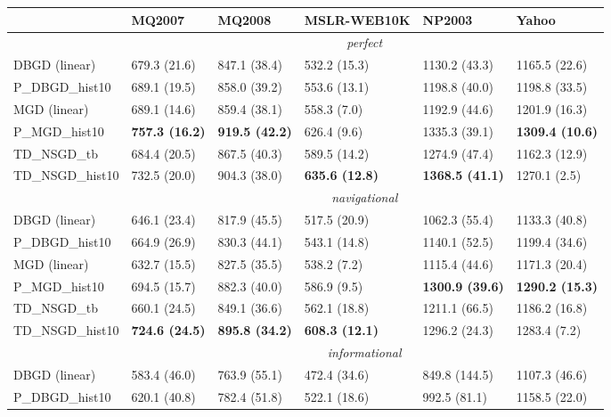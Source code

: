 \begin{tabular*}{\textwidth}{@{\extracolsep{\fill} } l  l l l l l  }
\toprule
 & { \small \textbf{MQ2007}}  & { \small \textbf{MQ2008}}  & { \small \textbf{MSLR-WEB10K}}  & { \small \textbf{NP2003}}  & { \small \textbf{Yahoo}} \\
\midrule
& \multicolumn{5}{|c|}{\textit{perfect}} \\
\midrule
DBGD (linear) & 679.3 {\tiny (21.6)} & 847.1 {\tiny (38.4)} & 532.2 {\tiny (15.3)} & 1130.2 {\tiny (43.3)} & 1165.5 {\tiny (22.6)} \\
P\_DBGD\_hist10 & 689.1 {\tiny (19.5)} & 858.0 {\tiny (39.2)} & 553.6 {\tiny (13.1)} & 1198.8 {\tiny (40.0)} & 1198.8 {\tiny (33.5)} \\
MGD (linear) & 689.1 {\tiny (14.6)} & 859.4 {\tiny (38.1)} & 558.3 {\tiny (7.0)} & 1192.9 {\tiny (44.6)} & 1201.9 {\tiny (16.3)} \\
P\_MGD\_hist10 & \bf 757.3 {\tiny (16.2)} & \bf 919.5 {\tiny (42.2)} & 626.4 {\tiny (9.6)} & 1335.3 {\tiny (39.1)} & \bf 1309.4 {\tiny (10.6)} \\
TD\_NSGD\_tb & 684.4 {\tiny (20.5)} & 867.5 {\tiny (40.3)} & 589.5 {\tiny (14.2)} & 1274.9 {\tiny (47.4)} & 1162.3 {\tiny (12.9)} \\
TD\_NSGD\_hist10 & 732.5 {\tiny (20.0)} & 904.3 {\tiny (38.0)} & \bf 635.6 {\tiny (12.8)} & \bf 1368.5 {\tiny (41.1)} & 1270.1 {\tiny (2.5)} \\
\midrule
& \multicolumn{5}{|c|}{\textit{navigational}} \\
\midrule
DBGD (linear) & 646.1 {\tiny (23.4)} & 817.9 {\tiny (45.5)} & 517.5 {\tiny (20.9)} & 1062.3 {\tiny (55.4)} & 1133.3 {\tiny (40.8)} \\
P\_DBGD\_hist10 & 664.9 {\tiny (26.9)} & 830.3 {\tiny (44.1)} & 543.1 {\tiny (14.8)} & 1140.1 {\tiny (52.5)} & 1199.4 {\tiny (34.6)} \\

MGD (linear) & 632.7 {\tiny (15.5)} & 827.5 {\tiny (35.5)} & 538.2 {\tiny (7.2)} & 1115.4 {\tiny (44.6)} & 1171.3 {\tiny (20.4)} \\
P\_MGD\_hist10 & 694.5 {\tiny (15.7)} & 882.3 {\tiny (40.0)} & 586.9 {\tiny (9.5)} & \bf 1300.9 {\tiny (39.6)} & \bf 1290.2 {\tiny (15.3)} \\

TD\_NSGD\_tb & 660.1 {\tiny (24.5)} & 849.1 {\tiny (36.6)} & 562.1 {\tiny (18.8)} & 1211.1 {\tiny (66.5)} & 1186.2 {\tiny (16.8)} \\
TD\_NSGD\_hist10 & \bf 724.6 {\tiny (24.5)} & \bf 895.8 {\tiny (34.2)} & \bf 608.3 {\tiny (12.1)} & 1296.2 {\tiny (24.3)} & 1283.4 {\tiny (7.2)} \\
\midrule
& \multicolumn{5}{|c|}{\textit{informational}} \\
\midrule
DBGD (linear) & 583.4 {\tiny (46.0)} & 763.9 {\tiny (55.1)} & 472.4 {\tiny (34.6)} & 849.8 {\tiny (144.5)} & 1107.3 {\tiny (46.6)} \\
P\_DBGD\_hist10 & 620.1 {\tiny (40.8)} & 782.4 {\tiny (51.8)} & 522.1 {\tiny (18.6)} & 992.5 {\tiny (81.1)} & 1158.5 {\tiny (22.0)} \\


\end{tabular*}
